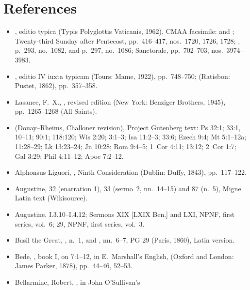 \section{References}

{\footnotesize
\begin{itemize}[leftmargin=1.2em,itemsep=.15em]
\item {}, editio typica (Typis
Polyglottis Vaticanis, 1962), CMAA facsimile:  and
; Twenty-third Sunday after
Pentecost, pp.~416--417, nos.~1720, 1726, 1728; ,
p.~293, no.~1082, and p.~297, no.~1086; Sanctorale, pp.~702--703,
nos.~3974--3983.
\item {}, editio IV iuxta typicam (Tours: Mame, 1922),
pp.~748--750;  (Ratisbon: Pustet, 1862),
pp.~357--358.
\item Lasance, F.~X., ,
revised edition (New York: Benziger Brothers, 1945), pp.~1265--1268 (All
Saints).
\item {} (Douay--Rheims,
Challoner revision), Project Gutenberg text: Ps 32:1;
33:1, 10--11; 90:1; 118:120; Wis 2:20; 3:1--3; Isa 11:2--3; 33:6; Ezech 9:4;
Mt 5:1--12a; 11:28--29; Lk 13:23--24; Jn 10:28; Rom 9:4--5;
1~Cor 4:11; 13:12; 2~Cor 1:7; Gal 3:29; Phil 4:11--12; Apoc 7:2--12.
\item Alphonsus Liguori, , Ninth Consideration
(Dublin: Duffy, 1843), pp.~117--122.
\item Augustine,  32 (enarration 1), 33
(sermo~2, nn.~14--15) and 87 (n.~5), Migne Latin text (Wikisource).
\item Augustine,  I.3.10--I.4.12; Sermons
XIX [LXIX Ben.] and LXI, NPNF, first series, vol.~6;  29,
NPNF, first series, vol.~3.
\item Basil the Great, , n.~1, and
, nn.~6--7, PG 29 (Paris, 1860), Latin
version.
\item Bede, , book I, on 7:1--12, in E.~Marshall's
English,  (Oxford and London: James
Parker, 1878), pp.~44--46, 52--53.
\item Bellarmine, Robert, , in John O'Sullivan's

\end{itemize}}
